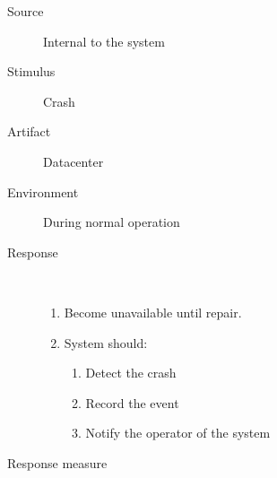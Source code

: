 \begin{description}
	\item[Source] Internal to the system
	\item[Stimulus] Crash
	\item[Artifact] Datacenter
	\item[Environment] During normal operation
	\item[Response] \
	\begin{enumerate}
	  \item Become unavailable until repair.  %
	  \item System should:
	  \begin{enumerate}
	  	\item Detect the crash
	  	\item Record the event
	  	\item Notify the operator of the system %
	  \end{enumerate}
	\end{enumerate}
	\item[Response measure] \ %
\end{description}